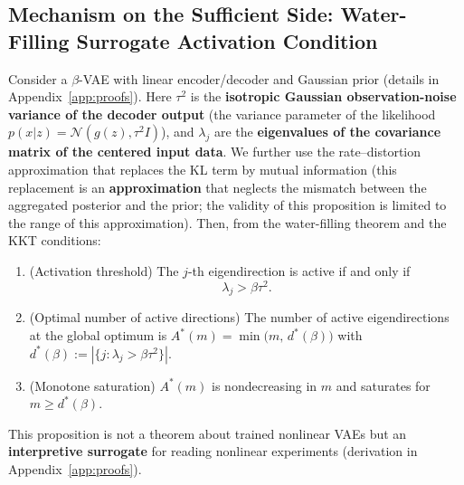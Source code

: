 \documentclass[make,article,submit,pdftex,moreauthors]{Definitions/mdpi}
\newcommand{\dstar}{d^{*}(\beta)}
\begin{document}
\subsection{Mechanism on the Sufficient Side: Water-Filling Surrogate Activation Condition}\label{sec:theory_wf}

\begin{Proposition}\label{thm:linear_vae}
Consider a $\beta$-VAE with linear encoder/decoder and Gaussian prior
(details in Appendix~\ref{app:proofs}).
Here $\tau^2$ is the \textbf{isotropic Gaussian observation-noise variance
of the decoder output} (the variance parameter of the likelihood
$p(x|z) = \mathcal{N}(g(z), \tau^2 I)$), and $\lambda_j$ are the
\textbf{eigenvalues of the covariance matrix of the centered input data}.
We further use the rate--distortion approximation that replaces the KL term
by mutual information (this replacement is an \textbf{approximation} that
neglects the mismatch between the aggregated posterior and the prior; the
validity of this proposition is limited to the range of this
approximation).
Then, from the water-filling theorem and the KKT conditions:
\begin{enumerate}
  \item (Activation threshold) The $j$-th eigendirection is active if and
        only if
        \begin{equation}
          \lambda_j > \beta \tau^2 .
          \label{eq:au_threshold}
        \end{equation}
  \item (Optimal number of active directions)
        The number of active eigendirections at the global optimum is
        $A^*(m) = \min\bigl(m,\, \dstar\bigr)$ with
        $\dstar := |\{j : \lambda_j > \beta\tau^2\}|$.
  \item (Monotone saturation) $A^*(m)$ is nondecreasing in $m$ and
        saturates for $m \geq \dstar$.
\end{enumerate}
This proposition is not a theorem about trained nonlinear VAEs but an
\textbf{interpretive surrogate} for reading nonlinear experiments
(derivation in Appendix~\ref{app:proofs}).
\end{Proposition}
\end{document}
